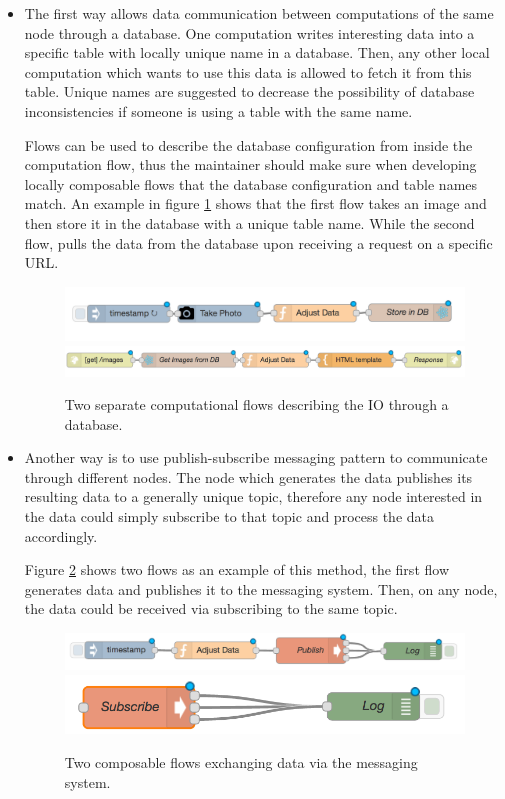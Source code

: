 \begin{itemize}
	\item The first way allows data communication between computations of the same node  through a database. One computation writes interesting data into a specific table with locally unique name in a database. Then, any other local computation which wants to use this data is allowed to fetch it from this table. Unique names are suggested to decrease the possibility of database inconsistencies if someone is using a table with the same name.
	 
	Flows can be used to describe the database configuration from inside the computation flow, thus the maintainer should make sure when developing  locally composable flows that the database configuration and table names match. An example in figure \ref{fig:db} shows that the first flow takes an image and then store it in the database with a unique table name.  While the second flow, pulls the data from the database upon receiving a request on a specific URL. 
	
	\begin{figure}[H]
		\centering
		\includegraphics[scale=0.5]{images/db-out.png}
		\includegraphics[scale=0.5]{images/db-in.png}
		\caption{Two separate computational flows describing the IO through a database.}
		\label{fig:db}
	\end{figure}
	
	\item Another way is to use  publish-subscribe messaging pattern to communicate through different nodes. The node which generates the data publishes its resulting data to a generally unique topic, therefore any node interested in the data could simply subscribe to that topic and process the data accordingly.
	
Figure \ref{fig:scampi} shows two flows as an example of this method, the first flow generates data and publishes it to the messaging system. Then, on any node, the data could be received via subscribing to the same topic.
	
	\begin{figure}[H]
		\centering
		\includegraphics[scale=0.6]{images/SCAMPI-pub.png}
		\includegraphics[scale=0.6]{images/SCAMPI-sub.png}
		\caption{Two composable flows exchanging data via the messaging system.}
		\label{fig:scampi}
	\end{figure}
	

\end{itemize}

